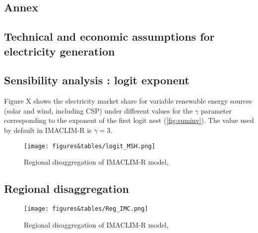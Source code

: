 
\begin{landscape}
    \section{Annex}
\subsection{Technical and economic assumptions for electricity generation}


















\subsection{Sensibility analysis : logit exponent}

Figure X shows the electricity market share for variable renewable energy sources (solar and wind, including CSP) under different values for the $\gamma$ parameter corresponding to the exponent of the first logit nest (\ref{fig:suminv}). The value used by default in IMACLIM-R is $\gamma = 3$. 

\begin{figure}[H]
    \centerline{\texttt{[image: figures\&tables/logit\_MSH.png]}}
    \caption{Regional disaggregation of IMACLIM-R model,  } 
    \label{fig:sensiblog}
\end{figure}

\end{landscape}


\subsection{Regional disaggregation}

\begin{figure}[H]
    \centerline{\texttt{[image: figures\&tables/Reg\_IMC.png]}}
    \caption{Regional disaggregation of IMACLIM-R model, \cite{Bibas2016} } 
    \label{fig:disag}
\end{figure}
